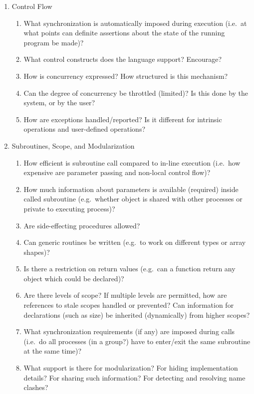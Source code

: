 \begin{small}
\begin{enumerate}
\begin{enumerate}
  \end{enumerate}
\item Control Flow
  \begin{enumerate}
  \item What synchronization is automatically imposed during execution
	(i.e.\ at what points can definite assertions about the state
	of the running program be made)?
  \item What control constructs does the language support?  Encourage?
  \item How is concurrency expressed?  How structured is this mechanism?
  \item Can the degree of concurrency be throttled (limited)?
	Is this done by the system, or by the user?
  \item How are exceptions handled/reported?
	Is it different for intrinsic operations and user-defined operations?
  \end{enumerate}
\item Subroutines, Scope, and Modularization
  \begin{enumerate}
  \item How efficient is subroutine call compared to in-line execution
	(i.e.\ how expensive are parameter passing and non-local control flow)?
  \item How much information about parameters is available (required)
	inside called subroutine
	(e.g.\ whether object is shared with other processes or private
	to executing process)?
  \item Are side-effecting procedures allowed?
  \item Can generic routines be written
	(e.g.\ to work on different types or array shapes)?
  \item Is there a restriction on return values (e.g.\ can a function return
	any object which could be declared)?
  \item Are there levels of scope?
	If multiple levels are permitted, how are references to stale scopes
	handled or prevented?
	Can information for declarations (such as size) be inherited (dynamically)
	from higher scopes?
  \item What synchronization requirements (if any) are imposed during calls
	(i.e.\ do all processes (in a group?) have to enter/exit the same subroutine
	at the same time)?
  \item What support is there for modularization?
	For hiding implementation details?
	For sharing such information?
	For detecting and resolving name clashes?
  \end{enumerate}

\end{enumerate}
\end{small}

